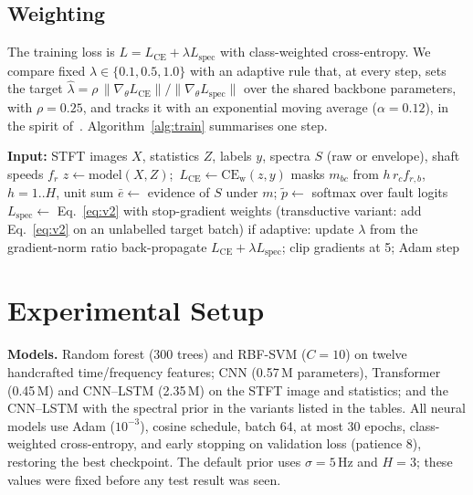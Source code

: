\documentclass[conference]{IEEEtran}
\newcommand{\Lspec}{L_{\mathrm{spec}}}
\begin{document}
\subsection{Weighting}
The training loss is $L=L_{\mathrm{CE}}+\lambda\Lspec$ with class-weighted
cross-entropy. We compare fixed $\lambda\in\{0.1,0.5,1.0\}$ with an adaptive
rule that, at every step, sets the target
$\hat\lambda=\rho\,\lVert\nabla_\theta L_{\mathrm{CE}}\rVert/\lVert\nabla_\theta\Lspec\rVert$
over the shared backbone parameters, with $\rho=0.25$, and tracks it with an
exponential moving average ($\alpha=0.12$), in the spirit
of~\cite{wang2021,mcclenny2023}. Algorithm~\ref{alg:train} summarises one step.

\begin{algorithm}[t]
\caption{Training step with the revised spectral prior}
\label{alg:train}
\begin{algorithmic}[1]
\STATE \textbf{Input:} STFT images $X$, statistics $Z$, labels $y$, spectra $S$ (raw or envelope), shaft speeds $f_r$
\STATE $z \leftarrow \mathrm{model}(X,Z)$;\ $L_{\mathrm{CE}}\leftarrow\mathrm{CE}_{\mathrm{w}}(z,y)$
\STATE masks $m_{bc}$ from $h\,r_c f_{r,b}$, $h=1..H$, unit sum
\STATE $\bar e\leftarrow$ evidence of $S$ under $m$; $\tilde p\leftarrow$ softmax over fault logits
\STATE $\Lspec\leftarrow$ Eq.~\eqref{eq:v2} with stop-gradient weights
\STATE (transductive variant: add Eq.~\eqref{eq:v2} on an unlabelled target batch)
\STATE if adaptive: update $\lambda$ from the gradient-norm ratio
\STATE back-propagate $L_{\mathrm{CE}}+\lambda\Lspec$; clip gradients at 5; Adam step
\end{algorithmic}
\end{algorithm}

\section{Experimental Setup}
\textbf{Models.} Random forest (300 trees) and RBF-SVM ($C=10$) on twelve
handcrafted time/frequency features; CNN (0.57\,M parameters), Transformer
(0.45\,M) and CNN--LSTM (2.35\,M) on the STFT image and statistics; and the
CNN--LSTM with the spectral prior in the variants listed in the tables. All
neural models use Adam ($10^{-3}$), cosine schedule, batch 64, at most 30
epochs, class-weighted cross-entropy, and early stopping on validation loss
(patience 8), restoring the best checkpoint. The default prior uses $\sigma=5$\,Hz
and $H=3$; these values were fixed before any test result was seen.
\end{document}
